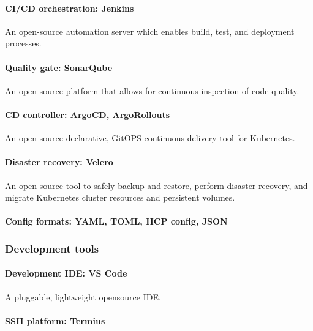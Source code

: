 \paragraph{CI/CD orchestration: Jenkins }

\hspace{7mm}An open-source automation server which enables build, test, and deployment processes. 

\paragraph{Quality gate: SonarQube }

\hspace{7mm}An open-source platform that allows for continuous inspection of code quality. 

\paragraph{CD controller: ArgoCD, ArgoRollouts }

\hspace{7mm}An open-source declarative, GitOPS continuous delivery tool for Kubernetes. 

\paragraph{Disaster recovery: Velero }

\hspace{7mm}An open-source tool to safely backup and restore, perform disaster recovery, and migrate Kubernetes cluster resources and persistent volumes. 

\paragraph{Config formats: YAML, TOML, HCP config, JSON }

\subsubsection{Development tools }

\paragraph{Development IDE: VS Code }

\hspace{7mm}A pluggable, lightweight opensource IDE. 

\paragraph{SSH platform: Termius }

